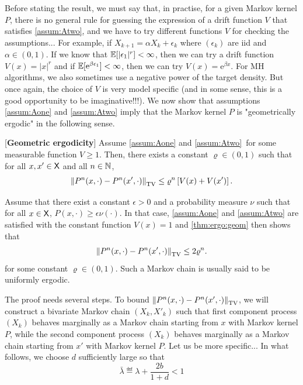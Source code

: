 \documentclass[english,graybox,envcountchap,envcountsame,sectrefs,shortlabels]{svmono}
\theoremstyle{style}
\newcommand{\rme}{\mathrm{e}}
\begin{document}
Before stating the result, we must say that, in practise, for a given Markov kernel $P$, there is no general rule for guessing the expression of a drift function $V$ that satisfies \ref{assum:Atwo}, and we have to try different functions $V$ for checking the assumptions... For example, if $X_{k+1}=\alpha X_k+\epsilon_k$ where $(\epsilon_k)$ are iid and $\alpha\in (0,1)$. If we know that $\mathbb{E}[|\epsilon_1|^r]<\infty$, then we can try a drift function $V(x)=|x|^r$ and if $\PE[\rme^{\beta \epsilon_1}]<\infty$, then we can  try $V(x)=\rme^{\beta x}$. For MH algorithms, we also sometimes use a negative power of the target density. But once again, the choice of $V$ is very model specific (and in some sense, this is a good opportunity to be imaginative!!!).
We now show that assumptions \ref{assum:Aone} and \ref{assum:Atwo} imply that the Markov kernel $P$ is "geometrically ergodic" in the following sense.
\begin{shaded}
\begin{theorem}\label{thm:ergo:geom} [{\bf Geometric ergodicity}] 
Assume \ref{assum:Aone} and \ref{assum:Atwo}\ for some measurable function $V\geq1$.
Then, there exists a constant $\varrho \in (0,1)$ such that for all $x,x'\in\mathsf{X}$ and all $n\in\mathbb{N}$,
$$
\left\|P^n(x,\cdot)-P^n(x',\cdot)\right\|_{\mathrm{TV}} \leq \varrho^n \left[V(x)+V(x')\right]  .
$$
\end{theorem}
\end{shaded}
\begin{remark}
Assume that there exist a constant $\epsilon>0$ and a probability measure $\nu$ such that for all $x\in\mathsf{X}$, $P(x,\cdot)\geq \epsilon \nu(\cdot)$. In that case, \ref{assum:Aone} and \ref{assum:Atwo} are satisfied with the constant function $V(x)=1$ and \autoref{thm:ergo:geom} then shows that
$$
\left\|P^n(x,\cdot)-P^n(x',\cdot)\right\|_{\mathrm{TV}} \leq 2 \varrho^n  .
$$
for some constant $\varrho\in(0,1)$. Such a Markov chain is usually said to be uniformly ergodic.
\end{remark}
The proof needs several steps. To bound $\left\|P^n(x,\cdot)-P^n(x',\cdot)\right\|_{\mathrm{TV}}$, we will construct a bivariate Markov chain $(X_k,X'_k)$ such that first component process $(X_k)$ behaves marginally as a Markov chain starting from $x$ with Markov kernel $P$, while the second component process $(X_k)$ behaves marginally as a Markov chain starting from $x'$ with Markov kernel $P$. Let us be more specific...
 In what follows, we choose $d$ sufficiently large so that
 \begin{equation}\label{eq:def:barlambda}
 \bar \lambda \eqdef \lambda +\frac{2b}{1+d}<1
 \end{equation}
\end{document}
